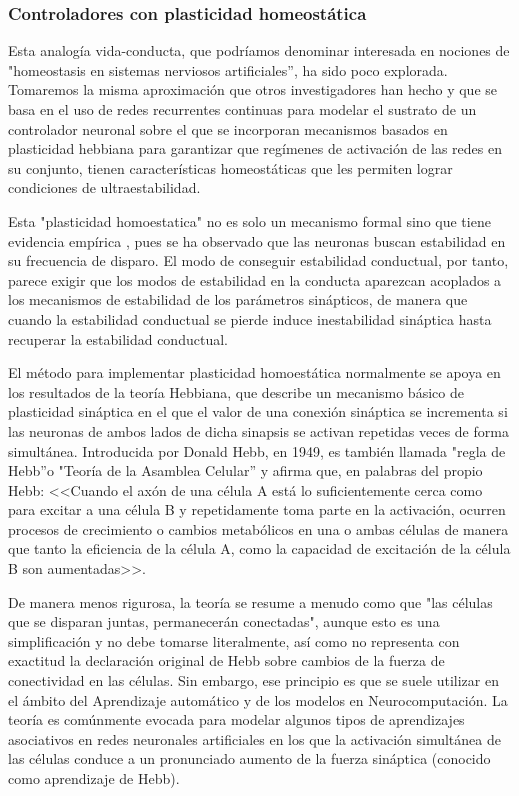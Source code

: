 \subsubsection{Controladores con plasticidad homeostática}
Esta analogía vida-conducta, que podríamos denominar interesada en nociones de "homeostasis en sistemas nerviosos artificiales”, ha sido poco explorada\cite{DiPaolo_1, DiPaolo_2, DiPaolo_3, MathayomchanBeer,HoinvilleHenaff}. Tomaremos la misma aproximación que otros investigadores han hecho y que se basa en el uso de redes recurrentes continuas para modelar el sustrato de un controlador neuronal sobre el que se incorporan mecanismos basados en plasticidad hebbiana para garantizar que regímenes de activación de las redes en su conjunto, tienen características homeostáticas que les permiten lograr condiciones de ultraestabilidad.

Esta "plasticidad homoestatica" no es solo un mecanismo formal sino que tiene evidencia empírica \cite{TurrigianoGG}, pues se ha observado que las neuronas buscan estabilidad en su frecuencia de disparo. El modo de conseguir estabilidad conductual, por tanto, parece exigir que los modos de estabilidad en la conducta aparezcan acoplados a los mecanismos de estabilidad de los parámetros sinápticos, de manera que cuando la estabilidad conductual se pierde induce inestabilidad sináptica hasta recuperar la estabilidad conductual.


El método para implementar plasticidad homoestática normalmente se apoya en los resultados de la teoría Hebbiana, que describe un mecanismo básico de plasticidad sináptica en el que el valor de una conexión sináptica se incrementa si las neuronas de ambos lados de dicha sinapsis se activan repetidas veces de forma simultánea. Introducida por Donald Hebb, en 1949, es también llamada "regla de Hebb”o "Teoría de la Asamblea Celular” y afirma que, en palabras del propio Hebb: <<Cuando el axón de una célula A está lo suficientemente cerca como para excitar a una célula B y repetidamente toma parte en la activación, ocurren procesos de crecimiento o cambios metabólicos en una o ambas células de manera que tanto la eficiencia de la célula A, como la capacidad de excitación de la célula B son aumentadas>>.

De manera menos rigurosa, la teoría se resume a menudo como que "las células que se disparan juntas, permanecerán conectadas", aunque esto es una simplificación y no debe tomarse literalmente, así como no representa con exactitud la declaración original de Hebb sobre cambios de la fuerza de conectividad en las células. Sin embargo, ese principio es que se suele utilizar en el ámbito del Aprendizaje automático y de los modelos en Neurocomputación. La teoría es comúnmente evocada para modelar algunos tipos de aprendizajes asociativos en redes neuronales artificiales en los que la activación simultánea de las células conduce a un pronunciado aumento de la fuerza sináptica (conocido como aprendizaje de Hebb).

